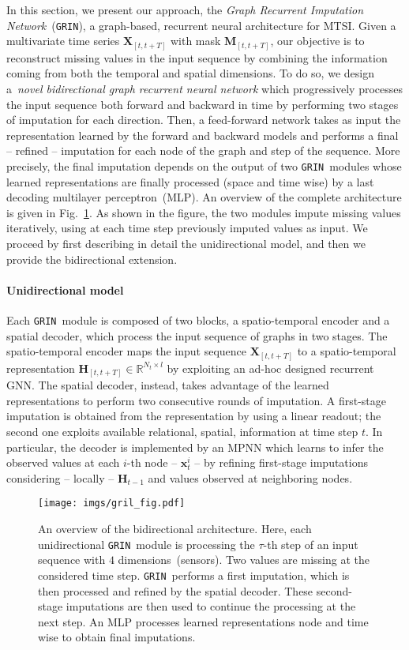 \documentclass{article} \usepackage{iclr2022_conference,times}
\def\vx{{\bm{x}}}
\def\mH{{\bm{H}}}
\def\mM{{\bm{M}}}
\def\mX{{\bm{X}}}
\def\sR{{\mathbb{R}}}
\newcommand{\GRIL}{\texttt{GRIN}}
\begin{document}
In this section, we present our approach, the \emph{Graph Recurrent Imputation Network}~(\GRIL), a graph-based, recurrent neural architecture for MTSI. Given a multivariate time series $\mX_{[t,t+T]}$ with mask $\mM_{[t,t+T]}$, our objective is to reconstruct missing values in the input sequence by combining the information coming from both the temporal and spatial dimensions. To do so, we design a~\emph{novel bidirectional graph recurrent neural network} which progressively processes the input sequence both forward and backward in time by performing two stages of imputation for each direction. Then, a feed-forward network takes as input the representation learned by the forward and backward models and performs a final -- refined -- imputation for each node of the graph and step of the sequence. More precisely, the final imputation depends on the output of two \GRIL\ modules whose learned representations are finally processed (space and time wise) by a last decoding multilayer perceptron~(MLP). An overview of the complete architecture is given in Fig.~\ref{fig:grill}. As shown in the figure, the two modules impute missing values iteratively, using at each time step previously imputed values as input. We proceed by first describing in detail the unidirectional model, and then we provide the bidirectional extension.

\paragraph{Unidirectional model} Each \GRIL\ module is composed of two blocks, a spatio-temporal encoder and a spatial decoder, which process the input sequence of graphs in two stages. The spatio-temporal encoder maps the input sequence $\mX_{[t,t+T]}$ to a spatio-temporal representation $\mH_{[t,t+T]}\in\sR^{N_t \times l}$ by exploiting an ad-hoc designed recurrent GNN. The spatial decoder, instead, takes advantage of the learned representations to perform two consecutive rounds of imputation.  A first-stage imputation is obtained from the representation by using a linear readout; the second one exploits available relational, spatial, information at time step $t$. In particular, the decoder is implemented by an MPNN which learns to infer the observed values at each $i$-th node -- $\vx^i_t$ -- by refining first-stage imputations considering -- locally -- $\mH_{t-1}$ and values observed at neighboring nodes.
\begin{figure}
    \centering
    \texttt{[image: imgs/gril\_fig.pdf]}
    \vspace{-0.75cm}
    \caption{An overview of the bidirectional architecture. Here, each unidirectional \GRIL\ module is processing the $\tau$-th step of an input sequence with $4$ dimensions~(sensors). Two values are missing at the considered time step. \GRIL\ performs a first imputation, which is then processed and refined by the spatial decoder. These second-stage imputations are then used to continue the processing at the next step. An MLP processes learned representations node and time wise to obtain final imputations.}
    \label{fig:grill}
\end{figure}
\end{document}
